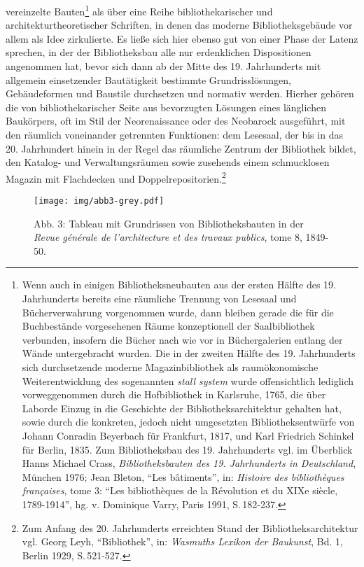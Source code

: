 vereinzelte Bauten\footnote{Wenn auch in einigen Bibliotheksneubauten
  aus der ersten Hälfte des 19. Jahrhunderts bereits eine räumliche
  Trennung von Lesesaal und Bücherverwahrung vorgenommen wurde, dann
  bleiben gerade die für die Buchbestände vorgesehenen Räume
  konzeptionell der Saalbibliothek verbunden, insofern die Bücher nach
  wie vor in Büchergalerien entlang der Wände untergebracht wurden. Die
  in der zweiten Hälfte des 19. Jahrhunderts sich durchsetzende moderne
  Magazinbibliothek als raumökonomische Weiterentwicklung des
  sogenannten \emph{stall system} wurde offensichtlich lediglich
  vorweggenommen durch die Hofbibliothek in Karlsruhe, 1765, die über
  Laborde Einzug in die Geschichte der Bibliotheksarchitektur gehalten
  hat, sowie durch die konkreten, jedoch nicht umgesetzten
  Bibliotheksentwürfe von Johann Conradin Beyerbach für Frankfurt, 1817,
  und Karl Friedrich Schinkel für Berlin, 1835. Zum Bibliotheksbau des
  19. Jahrhunderts vgl. im Überblick Hanns Michael Crass,
  \emph{Bibliotheksbauten des 19. Jahrhunderts in Deutschland}, München
  1976; Jean Bleton, \enquote{Les bâtiments}, in: \emph{Histoire des
  bibliothèques françaises}, tome 3: \enquote{Les bibliothèques de la
  Révolution et du XIXe siècle, 1789-1914}, hg. v. Dominique Varry,
  Paris 1991, S.\,182-237.} als über eine Reihe bibliothekarischer und
architekturtheoretischer Schriften, in denen das moderne
Bibliotheksgebäude vor allem als Idee zirkulierte. Es ließe sich hier
ebenso gut von einer Phase der Latenz sprechen, in der der
Bibliotheksbau alle nur erdenklichen Dispositionen angenommen hat, bevor
sich dann ab der Mitte des 19. Jahrhunderts mit allgemein einsetzender
Bautätigkeit bestimmte Grundrisslösungen, Gebäudeformen und Baustile
durchsetzen und normativ werden. Hierher gehören die von
bibliothekarischer Seite aus bevorzugten Lösungen eines länglichen
Baukörpers, oft im Stil der Neorenaissance oder des Neobarock
ausgeführt, mit den räumlich voneinander getrennten Funktionen: dem
Lesesaal, der bis in das 20. Jahrhundert hinein in der Regel das
räumliche Zentrum der Bibliothek bildet, den Katalog- und
Verwaltungsräumen sowie zusehends einem schmucklosen Magazin mit
Flachdecken und Doppelrepositorien.\footnote{Zum Anfang des 20.
  Jahrhunderts erreichten Stand der Bibliotheksarchitektur vgl. Georg
  Leyh, \enquote{Bibliothek}, in: \emph{Wasmuths Lexikon der Baukunst},
  Bd. 1, Berlin 1929, S.\,521-527.}

\begin{figure}[htbp]
\centering
\texttt{[image: img/abb3-grey.pdf]}
\caption*{Abb. 3: Tableau mit Grundrissen von Bibliotheksbauten in der
\emph{Revue générale de l'architecture et des travaux publics}, tome 8,
1849-50.}
\end{figure}

